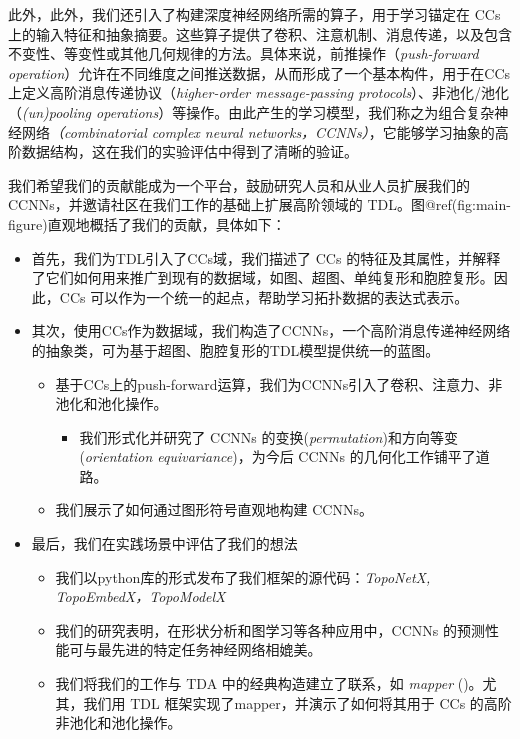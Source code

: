 \documentclass[
  12pt,
]{krantz}
\providecommand{\tightlist}{%
  \setlength{\itemsep}{0pt}\setlength{\parskip}{0pt}}
\begin{document}
此外，此外，我们还引入了构建深度神经网络所需的算子，用于学习锚定在
CCs上的输入特征和抽象摘要。这些算子提供了卷积、注意机制、消息传递，以及包含不变性、等变性或其他几何规律的方法。具体来说，前推操作（\emph{push-forward
operation}）允许在不同维度之间推送数据，从而形成了一个基本构件，用于在CCs上定义高阶消息传递协议（\emph{higher-order
message-passing protocols}）、非池化/池化（\emph{(un)pooling
operations}）等操作。由此产生的学习模型，我们称之为组合复杂神经网络\emph{（combinatorial
complex neural
networks，CCNNs）}，它能够学习抽象的高阶数据结构，这在我们的实验评估中得到了清晰的验证。

我们希望我们的贡献能成为一个平台，鼓励研究人员和从业人员扩展我们的
CCNNs，并邀请社区在我们工作的基础上扩展高阶领域的
TDL。图@ref(fig:main-figure)直观地概括了我们的贡献，具体如下：

\begin{itemize}
\item
  首先，我们为TDL引入了CCs域，我们描述了 CCs
  的特征及其属性，并解释了它们如何用来推广到现有的数据域，如图、超图、单纯复形和胞腔复形。因此，CCs
  可以作为一个统一的起点，帮助学习拓扑数据的表达式表示。
\item
  其次，使用CCs作为数据域，我们构造了CCNNs，一个高阶消息传递神经网络的抽象类，可为基于超图、胞腔复形的TDL模型提供统一的蓝图。

  \begin{itemize}
  \item
    基于CCs上的push-forward运算，我们为CCNNs引入了卷积、注意力、非池化和池化操作。

    \begin{itemize}
    \tightlist
    \item
      我们形式化并研究了 CCNNs
      的变换(\emph{permutation})和方向等变(\emph{orientation
      equivariance})，为今后 CCNNs 的几何化工作铺平了道路。
    \end{itemize}
  \item
    我们展示了如何通过图形符号直观地构建 CCNNs。
  \end{itemize}
\item
  最后，我们在实践场景中评估了我们的想法

  \begin{itemize}
  \item
    我们以python库的形式发布了我们框架的源代码：\emph{TopoNetX,
    TopoEmbedX，TopoModelX}
  \item
    我们的研究表明，在形状分析和图学习等各种应用中，CCNNs
    的预测性能可与最先进的特定任务神经网络相媲美。
  \item
    我们将我们的工作与 TDA 中的经典构造建立了联系，如 \emph{mapper}
    ()。尤其，我们用 TDL 框架实现了mapper，并演示了如何将其用于 CCs
    的高阶非池化和池化操作。


\end{itemize}
\end{itemize}
\end{document}
